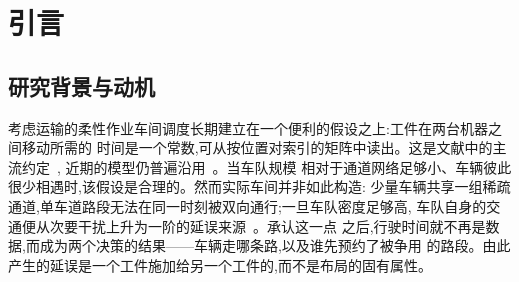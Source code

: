 \documentclass[manuscript,screen,review]{acmart}
\begin{document}

\author{待填 作者一}

\author{待填 作者二}

\renewcommand{\shortauthors}{待填 作者一 等}






\maketitle
\section{引言}
\label{sec:Chapter_I}

\subsection{研究背景与动机}

考虑运输的柔性作业车间调度长期建立在一个便利的假设之上:工件在两台机器之间移动所需的
时间是一个常数,可从按位置对索引的矩阵中读出。这是文献中的主流约定~\cite{xin2025review},
近期的模型仍普遍沿用~\cite{meng2025cp,qin2026knowledge,fu2025integrated}。当车队规模
相对于通道网络足够小、车辆彼此很少相遇时,该假设是合理的。然而实际车间并非如此构造:
少量车辆共享一组稀疏通道,单车道路段无法在同一时刻被双向通行;一旦车队密度足够高,
车队自身的交通便从次要干扰上升为一阶的延误来源~\cite{kim2026congestion}。承认这一点
之后,行驶时间就不再是数据,而成为两个决策的结果——车辆走哪条路,以及谁先预约了被争用
的路段。由此产生的延误是一个工件施加给另一个工件的,而不是布局的固有属性。
\end{document}
